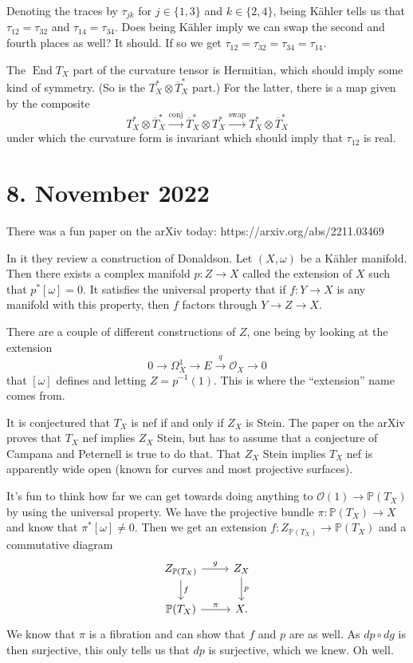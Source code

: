 \documentclass[11pt]{article}
\theoremstyle{definition}
\newcommand{\kk}[1]{\mathbb{#1}}
\newcommand{\cc}[1]{\mathcal{#1}}
\def\ov#1{\overline{#1}}
\DeclareMathOperator{\End}{End}
\begin{document}
Denoting the traces by $\tau_{jk}$ for $j \in \{1, 3\}$ and $k \in \{2, 4\}$,
being K\"ahler tells us that $\tau_{12} = \tau_{32}$ and $\tau_{14} = \tau_{34}$.
Does being K\"ahler imply we can swap the second and fourth places as well?
It should.
If so we get $\tau_{12} = \tau_{32} = \tau_{34} = \tau_{14}$.

The $\End T_X$ part of the curvature tensor is Hermitian, which should imply
some kind of symmetry. (So is the $T_X^* \otimes \ov T_X^*$ part.)
For the latter, there is a map given by the composite
$$
T_X^* \otimes \ov T_X^* \stackrel{\text{conj}}{\longrightarrow}
\ov T_X^* \otimes T_X^* \stackrel{\text{swap}}{\longrightarrow}
T_X^* \otimes \ov T_X^*
$$
under which the curvature form is invariant
which should imply that $\tau_{12}$ is real.

\section{8. November 2022}

There was a fun paper on the arXiv today: https://arxiv.org/abs/2211.03469

In it they review a construction of Donaldson.
Let $(X,\omega)$ be a K\"ahler manifold.
Then there exists a complex manifold $p : Z \to X$ called the extension of $X$
such that $p^*[\omega] = 0$.
It satisfies the universal property that if $f : Y \to X$ is any manifold with
this property, then $f$ factors through $Y \to Z \to X$.

There are a couple of different constructions of $Z$, one being by looking at
the extension
$$
0 \longrightarrow
\Omega_X^1 \longrightarrow
E \stackrel{q}{\longrightarrow}
\mathcal O_X \longrightarrow 0
$$
that $[\omega]$ defines and letting $Z = p^{-1}(1)$.
This is where the ``extension'' name comes from.

It is conjectured that $T_X$ is nef if and only if $Z_X$ is Stein.
The paper on the arXiv proves that $T_X$ nef implies $Z_X$ Stein, but has to
assume that a conjecture of Campana and Peternell is true to do that.
That $Z_X$ Stein implies $T_X$ nef is apparently wide open (known for curves
and most projective surfaces).

It's fun to think how far we can get towards doing anything to $\cc O(1) \to
\kk P(T_X)$ by using the universal property.
We have the projective bundle $\pi : \kk P(T_X) \to X$ and know that
$\pi^*[\omega] \not= 0$.
Then we get an extension $f : Z_{\kk P(T_X)} \to \kk P(T_X)$ and a commutative diagram
$$
\begin{tikzcd}
Z_{\kk P(T_X)}
\ar[r,"g"] \ar[d,"f"]
&
Z_X
\ar[d,"p"]
\\
\kk P(T_X)
\ar[r, "\pi"]
&
X.
\end{tikzcd}
$$
We know that $\pi$ is a fibration and can show that $f$ and $p$ are as well.
As $dp \circ dg$ is then surjective, this only tells us that $dp$ is
surjective, which we knew.
Oh well.
\end{document}
